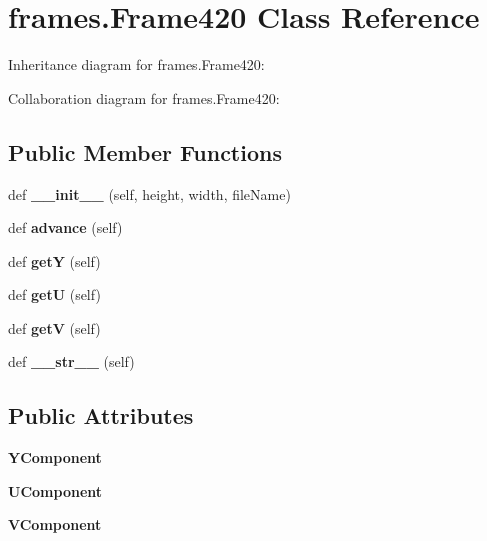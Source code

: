 \hypertarget{classframes_1_1Frame420}{}\section{frames.\+Frame420 Class Reference}
\label{classframes_1_1Frame420}


Inheritance diagram for frames.\+Frame420\+:


Collaboration diagram for frames.\+Frame420\+:
\subsection*{Public Member Functions}
\begin{DoxyCompactItemize}
\item 
\mbox{\label{classframes_1_1Frame420_a5dd9c3f9d01b9ad71a532413e5a947e5}} 
def {\bfseries \+\_\+\+\_\+init\+\_\+\+\_\+} (self, height, width, file\+Name)
\item 
\mbox{\label{classframes_1_1Frame420_a12588f484948b89d63d420abcd13565c}} 
def {\bfseries advance} (self)
\item 
\mbox{\label{classframes_1_1Frame420_a5d1cf1d6d7260631093a6bf241f301e9}} 
def {\bfseries getY} (self)
\item 
\mbox{\label{classframes_1_1Frame420_af3dead77bac3bb144cea87e8662a72d9}} 
def {\bfseries getU} (self)
\item 
\mbox{\label{classframes_1_1Frame420_acebdc634c6504cef7c5ae9752bd61616}} 
def {\bfseries getV} (self)
\item 
\mbox{\label{classframes_1_1Frame420_acc8ec88a2e8ad8fa1c7a31171494e694}} 
def {\bfseries \+\_\+\+\_\+str\+\_\+\+\_\+} (self)
\end{DoxyCompactItemize}
\subsection*{Public Attributes}
\begin{DoxyCompactItemize}
\item 
\mbox{\label{classframes_1_1Frame420_acc5991717d8ce4fccfaf57570a3ab692}} 
{\bfseries Y\+Component}
\item 
\mbox{\label{classframes_1_1Frame420_adda236c709d85aa64115ac90592db95e}} 
{\bfseries U\+Component}
\item 
\mbox{\label{classframes_1_1Frame420_a83e68d6b79a3a4dc145c99682a90680e}} 
{\bfseries V\+Component}
\end{DoxyCompactItemize}


